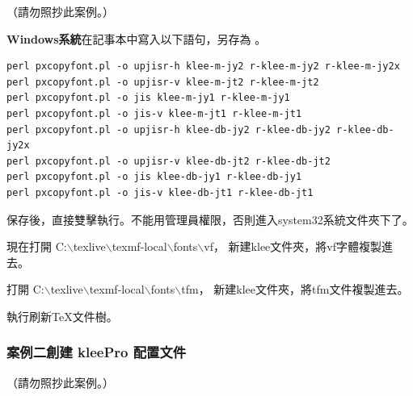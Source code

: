 （請勿照抄此案例。）

\par{}{\bfseries{Windows系統}}在記事本中寫入以下語句，另存為 。
\begin{lstlisting}[firstnumber=1]
perl pxcopyfont.pl -o upjisr-h klee-m-jy2 r-klee-m-jy2 r-klee-m-jy2x
perl pxcopyfont.pl -o upjisr-v klee-m-jt2 r-klee-m-jt2
perl pxcopyfont.pl -o jis klee-m-jy1 r-klee-m-jy1
perl pxcopyfont.pl -o jis-v klee-m-jt1 r-klee-m-jt1
perl pxcopyfont.pl -o upjisr-h klee-db-jy2 r-klee-db-jy2 r-klee-db-jy2x
perl pxcopyfont.pl -o upjisr-v klee-db-jt2 r-klee-db-jt2
perl pxcopyfont.pl -o jis klee-db-jy1 r-klee-db-jy1
perl pxcopyfont.pl -o jis-v klee-db-jt1 r-klee-db-jt1
\end{lstlisting}

\par{}保存後，直接雙擊執行。不能用管理員權限，否則進入system32系統文件夾下了。
\par{}現在打開
{\color{red}C:$\backslash$texlive$\backslash$texmf-local$\backslash$fonts$\backslash$vf}，
新建klee文件夾，將vf字體複製進去。
\par{}打開
{\color{red}C:$\backslash$texlive$\backslash$texmf-local$\backslash$fonts$\backslash$tfm}，
新建klee文件夾，將tfm文件複製進去。
\par{}執行刷新{\TeX}文件樹。


\subsubsection*{案例二創建 {kleePro} 配置文件}

（請勿照抄此案例。）

